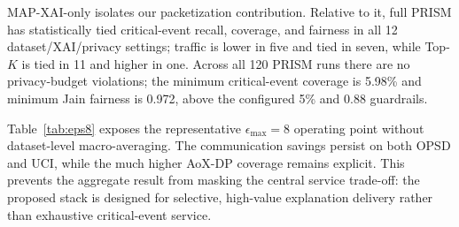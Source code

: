 \documentclass[conference]{IEEEtran}
\begin{document}
MAP-XAI-only isolates our packetization contribution. Relative to it, full
PRISM has statistically tied critical-event recall, coverage, and fairness in
all 12 dataset/XAI/privacy settings; traffic is lower in five and tied in
seven, while Top-$K$ is tied in 11 and higher in one. Across all 120 PRISM
runs there are no privacy-budget violations; the minimum critical-event
coverage is 5.98\% and minimum Jain fairness is 0.972, above the configured
5\% and 0.88 guardrails.

\begin{table}[t]
\caption{Representative $\epsilon_{\max}=8$ results, averaged over the
two attribution methods and 10 paired seeds. MAP is the proposed
MAP-XAI-only restriction.}
\label{tab:eps8}
\centering
\scriptsize
\setlength{\tabcolsep}{2.4pt}
\end{table}

Table~\ref{tab:eps8} exposes the representative $\epsilon_{\max}=8$
operating point without dataset-level macro-averaging. The communication
savings persist on both OPSD and UCI, while the much higher AoX-DP
coverage remains explicit. This prevents the aggregate result from
masking the central service trade-off: the proposed stack is designed
for selective, high-value explanation delivery rather than exhaustive
critical-event service.
\end{document}
